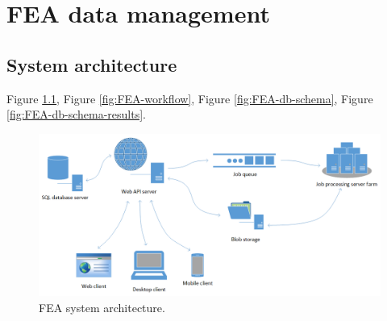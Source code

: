 \chapter{FEA data management}
\label{chapter:data-management}




\section{System architecture}
\label{sec:system-architecture}


Figure \ref{fig:FEA-architecture}, Figure \ref{fig:FEA-workflow}, Figure \ref{fig:FEA-db-schema}, Figure \ref{fig:FEA-db-schema-results}.

\begin{figure}[H]
    \centering
    \includegraphics[width=\textwidth]{figures/FEA-architecture}
    \decoRule
    \caption{FEA system architecture.}
    \label{fig:FEA-architecture}
\end{figure}

